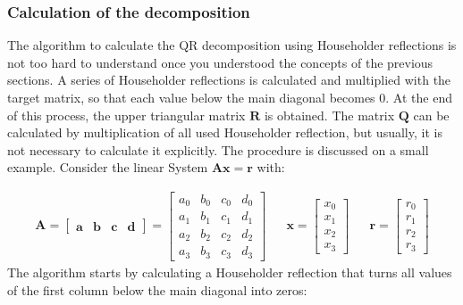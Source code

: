 
\subsubsection{Calculation of the decomposition}


The algorithm to calculate the QR decomposition using Householder reflections is not too hard to understand once you understood the concepts of the previous sections.
A series of Householder reflections is calculated and multiplied with the target matrix, so that each value below the main diagonal becomes 0.
At the end of this process, the upper triangular matrix $\mathbf{R}$ is obtained.
The matrix $\mathbf{Q}$ can be calculated by multiplication of all used Householder reflection, but usually, it is not necessary to calculate it explicitly.
The procedure is discussed on a small example.
Consider the linear System $\mathbf{Ax} = \mathbf{r}$ with:

\begin{align*}
\mathbf{A}
=
\begin{bmatrix}
\mathbf{a} & \mathbf{b} & \mathbf{c} & \mathbf{d}
\end{bmatrix}
=
\begin{bmatrix}
a_0&b_0&c_0&d_0\\
a_1&b_1&c_1&d_1\\
a_2&b_2&c_2&d_2\\
a_3&b_3&c_3&d_3
\end{bmatrix}
&&
\mathbf{x}
=
\begin{bmatrix}
x_0\\
x_1\\
x_2\\
x_3
\end{bmatrix}
&&
\mathbf{r}
=
\begin{bmatrix}
r_0\\
r_1\\
r_2\\
r_3
\end{bmatrix}
\end{align*}
%
The algorithm starts by calculating a Householder reflection that turns all values of the first column below the main diagonal into zeros:

